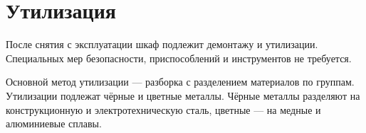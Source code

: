{\color{unimain}\section[Утилизация]{Утилизация}\color{black}}

\begin{enumsec}
  \item После снятия с эксплуатации шкаф подлежит демонтажу и утилизации. Специальных мер безопасности, приспособлений и инструментов не требуется.
  \item Основной метод утилизации — разборка с разделением материалов по группам. Утилизации подлежат чёрные и цветные металлы. Чёрные металлы разделяют на конструкционную и электротехническую сталь, цветные — на медные и алюминиевые сплавы.
\end{enumsec}